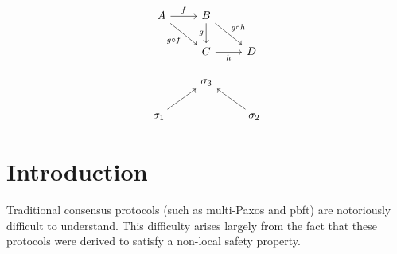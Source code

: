 \documentclass{article}
\theoremstyle{definition}
\begin{document}
\begin{equation}
\begin{tikzcd}
A \arrow[r,"f"]
  \arrow[dr,swap,"g\circ f"]
  &
B \arrow[dr,"g\circ h"]
  \arrow[d,swap,"g"]
  \\
  {}&
C \arrow[r,swap,"h"]
  &
D
\end{tikzcd}
\end{equation}


\begin{equation*}
\begin{tikzcd}
{}
  &
\sigma_3
  &
{}
  \\ 
\sigma_1
  \arrow[ur,""]
  &
{}
  &
\sigma_2
  \arrow[ul,""]
\end{tikzcd}
\end{equation*}



\fi









































































\iffalse



\section{Introduction}
Traditional consensus protocols (such as multi-Paxos and pbft) are notoriously difficult to understand. This difficulty arises largely from the fact that these protocols were derived to satisfy a non-local safety property.
\end{document}
